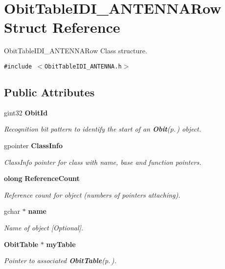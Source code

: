 \section{Obit\-Table\-IDI\_\-ANTENNARow Struct Reference}
\label{structObitTableIDI__ANTENNARow}
Obit\-Table\-IDI\_\-ANTENNARow Class structure.  


{\tt \#include $<$Obit\-Table\-IDI\_\-ANTENNA.h$>$}

\subsection*{Public Attributes}
\begin{CompactItemize}
\item 
gint32 {\bf Obit\-Id}
\begin{CompactList}\small\item\em Recognition bit pattern to identify the start of an {\bf Obit}{\rm (p.\,\pageref{structObit})} object. \item\end{CompactList}\item 
gpointer {\bf Class\-Info}
\begin{CompactList}\small\item\em Class\-Info pointer for class with name, base and function pointers. \item\end{CompactList}\item 
{\bf olong} {\bf Reference\-Count}
\begin{CompactList}\small\item\em Reference count for object (numbers of pointers attaching). \item\end{CompactList}\item 
gchar $\ast$ {\bf name}
\begin{CompactList}\small\item\em Name of object [Optional]. \item\end{CompactList}\item 
{\bf Obit\-Table} $\ast$ {\bf my\-Table}
\begin{CompactList}\small\item\em Pointer to associated {\bf Obit\-Table}{\rm (p.\,\pageref{structObitTable})}. \item\end{CompactList}\item 

\end{CompactItemize}
